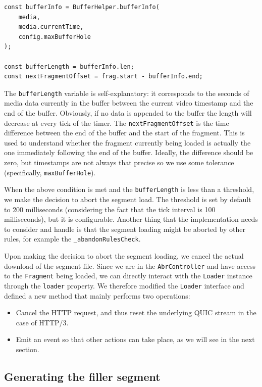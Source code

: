 \begin{verbatim}
const bufferInfo = BufferHelper.bufferInfo(
    media,
    media.currentTime,
    config.maxBufferHole
);

const bufferLength = bufferInfo.len;
const nextFragmentOffset = frag.start - bufferInfo.end;
\end{verbatim}

The \texttt{bufferLength} variable is self-explanatory: it corresponds to the seconds of media data currently in the buffer between the current video timestamp and the end of the buffer. Obviously, if no data is appended to the buffer the length will decrease at every tick of the timer. The \texttt{nextFragmentOffset} is the time difference between the end of the buffer and the start of the fragment. This is used to understand whether the fragment currently being loaded is actually the one immediately following the end of the buffer. Ideally, the difference should be zero, but timestamps are not always that precise so we use some tolerance (specifically, \texttt{maxBufferHole}).

When the above condition is met and the \texttt{bufferLength} is less than a threshold, we make the decision to abort the segment load. The threshold is set by default to 200 milliseconds (considering the fact that the tick interval is 100 milliseconds), but it is configurable. Another thing that the implementation needs to consider and handle is that the segment loading might be aborted by other rules, for example the \texttt{\_abandonRulesCheck}.

Upon making the decision to abort the segment loading, we cancel the actual download of the segment file. Since we are in the \texttt{AbrController} and have access to the \texttt{Fragment} being loaded, we can directly interact with the \texttt{Loader} instance through the \texttt{loader} property. We therefore modified the \texttt{Loader} interface and defined a new method that mainly performs two operations:

\begin{itemize}
    \item Cancel the HTTP request, and thus reset the underlying QUIC stream in the case of HTTP/3.
    \item Emit an event so that other actions can take place, as we will see in the next section.
\end{itemize}

\subsection{Generating the filler segment}
\label{sec:improvements/impl/filler}

